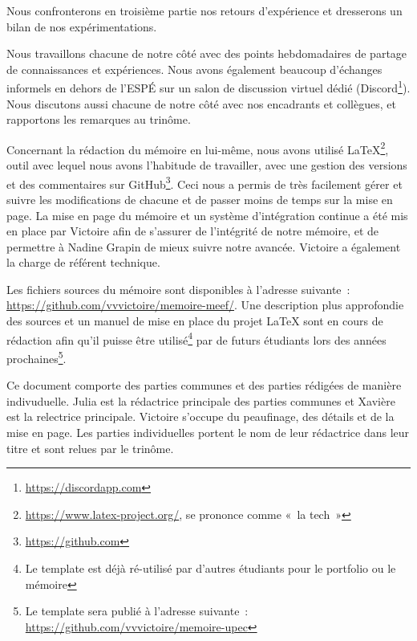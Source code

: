 Nous confronterons en troisième partie nos retours d'expérience et dresserons un bilan de nos expérimentations.

Nous travaillons chacune de notre côté avec des points hebdomadaires de partage de connaissances et expériences. Nous avons également beaucoup d’échanges informels en dehors de l’ESPÉ sur un salon de discussion virtuel dédié (Discord\footnote{\url{https://discordapp.com}}). Nous discutons aussi chacune de notre côté avec nos encadrants et collègues, et rapportons les remarques au trinôme.

Concernant la rédaction du mémoire en lui-même, nous avons utilisé \LaTeX\footnote{\url{https://www.latex-project.org/}, se prononce comme « la tech »},
outil avec lequel nous avons l’habitude de travailler, avec une gestion des versions et des commentaires sur GitHub\footnote{\url{https://github.com}}. Ceci nous a permis de très facilement gérer et suivre les modifications de chacune et de passer moins de temps sur la mise en page. La mise en page du mémoire et un système d'intégration continue a été mis en place par Victoire afin de s'assurer de l'intégrité de notre mémoire, et de permettre à Nadine Grapin de mieux suivre notre avancée. Victoire a également la charge de référent technique.

Les fichiers sources du mémoire sont disponibles à l'adresse suivante : \url{https://github.com/vvvictoire/memoire-meef/}. Une description plus approfondie des sources et un manuel de mise en place du projet \LaTeX{} sont en cours de rédaction afin qu'il puisse être utilisé\footnote{Le template est déjà ré-utilisé par d'autres étudiants pour le portfolio ou le mémoire} par de futurs étudiants lors des années prochaines\footnote{Le template sera publié à l'adresse
suivante : \url{https://github.com/vvvictoire/memoire-upec}}.

Ce document comporte des parties communes et des parties rédigées de manière indivuduelle. Julia est la rédactrice principale des parties communes et Xavière est la relectrice principale.
Victoire s'occupe du peaufinage, des détails et de la mise en page. Les parties individuelles portent le nom de leur rédactrice dans leur titre et sont relues par le trinôme.
